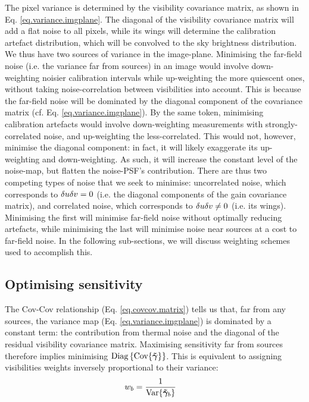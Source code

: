 \pg
The pixel variance is determined by the visibility covariance matrix, as shown in Eq. \ref{eq.variance.imgplane}. The diagonal of the visibility covariance matrix will add a flat noise to all pixels, while its wings will determine the calibration artefact distribution, which will be convolved to the sky brightness distribution. We thus have two sources of variance in the image-plane.
Minimising the far-field noise (i.e. the variance far from sources) in an image would involve down-weighting noisier calibration intervals while up-weighting the more quiescent ones, without taking noise-correlation between visibilities into account. This is because the far-field noise will be dominated by the diagonal component of the covariance matrix (cf. Eq. \ref{eq.variance.imgplane}). By the same token, minimising calibration artefacts would involve down-weighting measurements with strongly-correlated noise, and up-weighting the less-correlated. This would not, however, minimise the diagonal component: in fact, it will likely exaggerate its up-weighting and down-weighting. As such, it will increase the constant level of the noise-map, but flatten the noise-PSF's contribution. There are thus two competing types of noise that we seek to minimise: uncorrelated noise, which corresponds to $\delta u \delta v=0$ (i.e. the diagonal components of the gain covariance matrix), and correlated noise, which corresponds to $\delta u \delta v\ne 0$ (i.e. its wings). Minimising the first will minimise far-field noise without optimally reducing artefacts, while minimising the last will minimise noise near sources at a cost to far-field noise. In the following sub-sections, we will discuss weighting schemes used to accomplish this.


\subsection{Optimising sensitivity}\label{sec.lightweights.formalism}


\pg
The Cov-Cov relationship (Eq. \ref{eq.covcov.matrix}) tells us that, far from any sources, the variance map (Eq. \ref{eq.variance.imgplane}) is dominated by a constant term: the contribution from thermal noise and the diagonal of the residual visibility covariance matrix. Maximising sensitivity far from sources therefore implies minimising $\text{Diag}\left\{\textrm{Cov}\{\bm{\tilde{\gamma}}\}\right\}$. This is equivalent to assigning visibilities weights inversely proportional to their variance:
\begin{align}
w_{b} &= \frac{1}{\textrm{Var}\{\bm{\tilde{\gamma}}_{b}\}}
\end{align}

